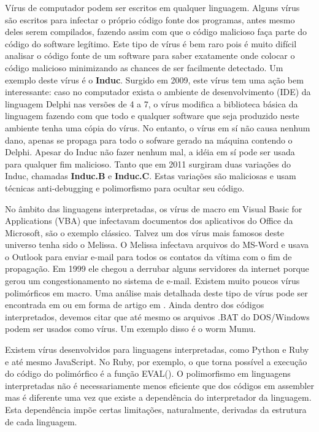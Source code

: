 Vírus de computador podem ser escritos em qualquer linguagem. Alguns vírus são escritos para infectar o próprio código fonte dos programas, antes mesmo deles serem compilados, fazendo assim com que o código malicioso faça parte do código do software legítimo. Este tipo de vírus é bem raro pois é muito difícil analisar o código fonte de um software para saber exatamente onde colocar o código malicioso minimizando as chances de ser facilmente detectado. Um exemplo deste vírus é o \textbf{Induc}\cite{symantec:4}. Surgido em 2009, este vírus tem uma ação bem interessante: caso no computador exista o ambiente de desenvolvimento (IDE) da linguagem Delphi\textsuperscript{\textregistered} nas versões de 4 a 7, o vírus modifica a biblioteca básica da linguagem fazendo com que todo e qualquer software que seja produzido neste ambiente tenha uma cópia do vírus. No entanto, o vírus em sí não causa nenhum dano, apenas se propaga para todo o sofware gerado na máquina contendo o Delphi. Apesar do Induc não fazer nenhum mal, a idéia em sí pode ser usada para qualquer fim malicioso. Tanto que em 2011 surgiram duas variações do Induc, chamadas \textbf{Induc.B} e \textbf{Induc.C}\cite{esset:1}. Estas variações são maliciosas e usam técnicas anti-debugging e polimorfismo para ocultar seu código.

No âmbito das linguagens interpretadas, os vírus de macro em Visual Basic for Applications (VBA) que infectavam documentos dos aplicativos do Office da Microsoft, são o exemplo clássico. Talvez um dos vírus mais famosos deste universo tenha sido o Melissa\cite{wiki:11}. O Melissa infectava arquivos do MS-Word e usava o Outlook para enviar e-mail para todos os contatos da vítima com o fim de propagação. Em 1999 ele chegou a derrubar alguns servidores da internet porque gerou um congestionamento no sistema de e-mail. Existem muito poucos vírus polimórficos em macro. Uma análise mais detalhada deste tipo de vírus pode ser encontrada em \cite{symantec:5,symantec:6} ou em forma de artigo em \cite{szappanos:1}. Ainda dentro dos códigos interpretados, devemos citar que até mesmo os arquivos .BAT do DOS/Windows podem ser usados como vírus. Um exemplo disso é o worm Mumu\cite{wiki:12}. 

Existem vírus desenvolvidos para linguagens interpretadas, como Python e Ruby e até mesmo JavaScript. No Ruby, por exemplo, o que torna possível a execução do código do polimórfico é a função EVAL(). O polimorfismo em linguagens interpretadas não é necessariamente menos eficiente que dos códigos em assembler mas é diferente uma vez que existe a dependência do interpretador da linguagem. Esta dependência impõe certas limitações, naturalmente, derivadas da estrutura de cada linguagem.

